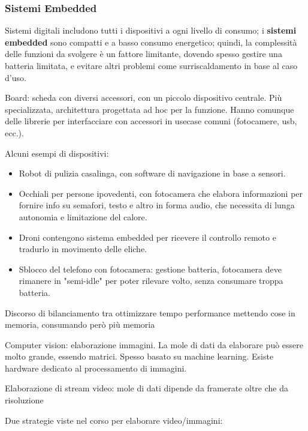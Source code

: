 \documentclass[a4paper,oneside]{book}
\begin{document}
    \subsubsection{Sistemi Embedded}

    Sistemi digitali includono tutti i dispositivi a ogni livello di consumo; i
    \textbf{sistemi embedded} sono compatti e a basso consumo energetico; quindi, 
    la complessità delle funzioni da svolgere è un fattore limitante, dovendo spesso
    gestire una batteria limitata, e evitare altri problemi come surriscaldamento in 
    base al caso d'uso.

    Board: scheda con diversi accessori, con un piccolo dispositivo centrale. 
    Più specializzata, architettura progettata ad hoc per la funzione. Hanno 
    comunque delle librerie per interfacciare con accessori in usecase comuni 
    (fotocamere, usb, ecc.).

    Alcuni esempi di dispositivi:

    \begin{itemize}
        \item Robot di pulizia casalinga, con software di navigazione in base
            a sensori.
        \item Occhiali per persone ipovedenti, con fotocamera che elabora informazioni 
            per fornire info su semafori, testo e altro in forma audio, che necessita 
            di lunga autonomia e limitazione del calore.
        \item Droni contengono sistema embedded per ricevere il controllo remoto e tradurlo
            in movimento delle eliche.
        \item Sblocco del telefono con fotocamera: gestione batteria, fotocamera deve rimanere in 
            "semi-idle" per poter rilevare volto, senza consumare troppa batteria.
    \end{itemize}

    Discorso di bilanciamento tra ottimizzare tempo performance mettendo cose in memoria, 
    consumando però più memoria

    Computer vision: elaborazione immagini. La mole di dati da elaborare può essere 
            molto grande, essendo matrici. Spesso basato su machine learning. 
            Esiste hardware dedicato al processamento di immagini.

    Elaborazione di stream video: mole di dati dipende da framerate oltre che da risoluzione

    Due strategie viste nel corso per elaborare video/immagini:
\end{document}
